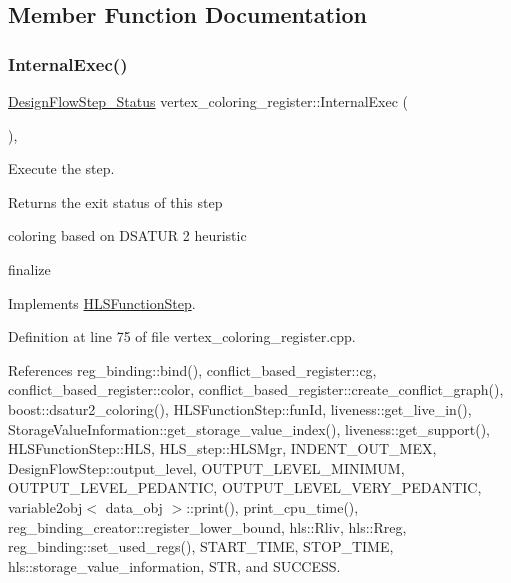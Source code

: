 \subsection{Member Function Documentation}
\mbox{\label{classvertex__coloring__register_ab7217f4137e671acf2dc41da060318b7}} 
\subsubsection{\texorpdfstring{Internal\+Exec()}{InternalExec()}}
{\footnotesize\ttfamily \hyperlink{design__flow__step_8hpp_afb1f0d73069c26076b8d31dbc8ebecdf}{Design\+Flow\+Step\+\_\+\+Status} vertex\+\_\+coloring\+\_\+register\+::\+Internal\+Exec (\begin{DoxyParamCaption}{ }\end{DoxyParamCaption})\hspace{0.3cm}{\ttfamily [override]}, {\ttfamily [virtual]}}



Execute the step. 

\begin{DoxyReturn}{Returns}
the exit status of this step 
\end{DoxyReturn}
coloring based on D\+S\+A\+T\+UR 2 heuristic

finalize 

Implements \hyperlink{classHLSFunctionStep_a8db4c00d080655984d98143206fc9fa8}{H\+L\+S\+Function\+Step}.



Definition at line 75 of file vertex\+\_\+coloring\+\_\+register.\+cpp.



References reg\+\_\+binding\+::bind(), conflict\+\_\+based\+\_\+register\+::cg, conflict\+\_\+based\+\_\+register\+::color, conflict\+\_\+based\+\_\+register\+::create\+\_\+conflict\+\_\+graph(), boost\+::dsatur2\+\_\+coloring(), H\+L\+S\+Function\+Step\+::fun\+Id, liveness\+::get\+\_\+live\+\_\+in(), Storage\+Value\+Information\+::get\+\_\+storage\+\_\+value\+\_\+index(), liveness\+::get\+\_\+support(), H\+L\+S\+Function\+Step\+::\+H\+LS, H\+L\+S\+\_\+step\+::\+H\+L\+S\+Mgr, I\+N\+D\+E\+N\+T\+\_\+\+O\+U\+T\+\_\+\+M\+EX, Design\+Flow\+Step\+::output\+\_\+level, O\+U\+T\+P\+U\+T\+\_\+\+L\+E\+V\+E\+L\+\_\+\+M\+I\+N\+I\+M\+UM, O\+U\+T\+P\+U\+T\+\_\+\+L\+E\+V\+E\+L\+\_\+\+P\+E\+D\+A\+N\+T\+IC, O\+U\+T\+P\+U\+T\+\_\+\+L\+E\+V\+E\+L\+\_\+\+V\+E\+R\+Y\+\_\+\+P\+E\+D\+A\+N\+T\+IC, variable2obj$<$ data\+\_\+obj $>$\+::print(), print\+\_\+cpu\+\_\+time(), reg\+\_\+binding\+\_\+creator\+::register\+\_\+lower\+\_\+bound, hls\+::\+Rliv, hls\+::\+Rreg, reg\+\_\+binding\+::set\+\_\+used\+\_\+regs(), S\+T\+A\+R\+T\+\_\+\+T\+I\+ME, S\+T\+O\+P\+\_\+\+T\+I\+ME, hls\+::storage\+\_\+value\+\_\+information, S\+TR, and S\+U\+C\+C\+E\+SS.

